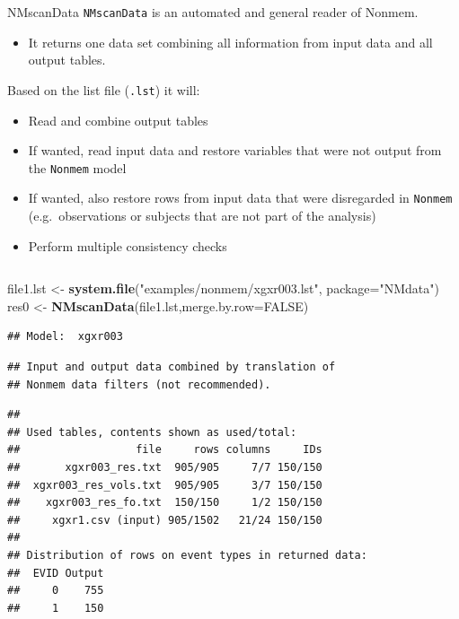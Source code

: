 \documentclass[
  8pt,
  ignorenonframetext,
  aspectratio=169]{beamer}
\newenvironment{Shaded}{\begin{snugshade}}{\end{snugshade}}
\newcommand{\DataTypeTok}[1]{\textcolor[rgb]{0.13,0.29,0.53}{#1}}
\newcommand{\KeywordTok}[1]{\textcolor[rgb]{0.13,0.29,0.53}{\textbf{#1}}}
\newcommand{\NormalTok}[1]{#1}
\newcommand{\OtherTok}[1]{\textcolor[rgb]{0.56,0.35,0.01}{#1}}
\newcommand{\StringTok}[1]{\textcolor[rgb]{0.31,0.60,0.02}{#1}}
\providecommand{\tightlist}{%
  \setlength{\itemsep}{0pt}\setlength{\parskip}{0pt}}
\begin{document}
\begin{frame}[fragile]{NMscanData}
\protect\hypertarget{nmscandata}{}
\texttt{NMscanData} is an automated and general reader of Nonmem.

\begin{itemize}
\tightlist
\item
  It returns one data set combining all information from input data and
  all output tables.
\end{itemize}

Based on the list file (\texttt{.lst}) it will:

\begin{itemize}
\tightlist
\item
  Read and combine output tables
\item
  If wanted, read input data and restore variables that were not output
  from the \texttt{Nonmem} model
\item
  If wanted, also restore rows from input data that were disregarded in
  \texttt{Nonmem} (e.g.~observations or subjects that are not part of
  the analysis)
\item
  Perform multiple consistency checks
\end{itemize}

\pause
\footnotesize

\begin{columns}[T]
\begin{column}{0.48\textwidth}
\begin{Shaded}
\begin{Highlighting}[]
\NormalTok{file1.lst \textless{}{-}}\StringTok{ }\KeywordTok{system.file}\NormalTok{(}\StringTok{"examples/nonmem/xgxr003.lst"}\NormalTok{,}
                         \DataTypeTok{package=}\StringTok{"NMdata"}\NormalTok{)}
\NormalTok{res0 \textless{}{-}}\StringTok{ }\KeywordTok{NMscanData}\NormalTok{(file1.lst,}\DataTypeTok{merge.by.row=}\OtherTok{FALSE}\NormalTok{)}
\end{Highlighting}
\end{Shaded}

\begin{verbatim}
## Model:  xgxr003
\end{verbatim}

\begin{verbatim}
## Input and output data combined by translation of
## Nonmem data filters (not recommended).
\end{verbatim}

\begin{verbatim}
## 
## Used tables, contents shown as used/total:
##                  file     rows columns     IDs
##       xgxr003_res.txt  905/905     7/7 150/150
##  xgxr003_res_vols.txt  905/905     3/7 150/150
##    xgxr003_res_fo.txt  150/150     1/2 150/150
##     xgxr1.csv (input) 905/1502   21/24 150/150
## 
## Distribution of rows on event types in returned data:
##  EVID Output
##     0    755
##     1    150
\end{verbatim}
\end{column}


\end{columns}
\end{frame}
\end{document}
